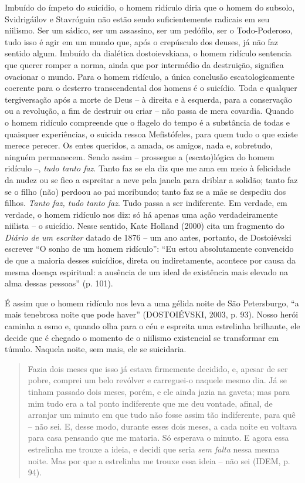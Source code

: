 Imbuído do ímpeto do suicídio, o homem ridículo diria que o homem do
subsolo, Svidrigáilov e Stavróguin não estão sendo suficientemente
radicais em seu niilismo. Ser um sádico, ser um assassino, ser um
pedófilo, ser o Todo-Poderoso, tudo isso é agir em um mundo que, após o
crepúsculo dos deuses, já não faz sentido algum. Imbuído da dialética
dostoievskiana, o homem ridículo sentencia que querer romper a norma,
ainda que por intermédio da destruição, significa ovacionar o mundo.
Para o homem ridículo, a única conclusão escatologicamente coerente para
o desterro transcendental dos homens é o suicídio. Toda e qualquer
tergiversação após a morte de Deus -- à direita e à esquerda, para a
conservação ou a revolução, a fim de destruir ou criar -- não passa de
mera covardia. Quando o homem ridículo compreende que o flagelo do tempo
é a substância de todas e quaisquer experiências, o suicida ressoa
Mefistófeles, para quem tudo o que existe merece perecer. Os entes
queridos, a amada, os amigos, nada e, sobretudo, ninguém permanecem.
Sendo assim -- prossegue a (escato)lógica do homem ridículo --,
\emph{tudo tanto faz}. Tanto faz se ela diz que me ama em meio à
felicidade da nudez ou se fico a espreitar a neve pela janela para
driblar a solidão; tanto faz se o filho (não) perdoou ao pai moribundo;
tanto faz se a mãe se despediu dos filhos. \emph{Tanto faz, tudo tanto
faz}. Tudo passa a ser indiferente. Em verdade, em verdade, o homem
ridículo nos diz: só há apenas uma ação verdadeiramente niilista -- o
suicídio. Nesse sentido, Kate Holland (2000) cita um fragmento do
\emph{Diário de um escritor} datado de 1876 -- um ano antes, portanto,
de Dostoiévski escrever ``O sonho de um homem ridículo'': ``Eu estou
absolutamente convencido de que a maioria desses suicídios, direta ou
indiretamente, acontece por causa da mesma doença espiritual: a ausência
de um ideal de existência mais elevado na alma dessas pessoas'' (p.
101).

É assim que o homem ridículo nos leva a uma gélida noite de São
Petersburgo, ``a mais tenebrosa noite que pode haver'' (DOSTOIÉVSKI,
2003, p. 93). Nosso herói caminha a esmo e, quando olha para o céu e
espreita uma estrelinha brilhante, ele decide que é chegado o momento de
o niilismo existencial se transformar em túmulo. Naquela noite, sem
mais, ele se suicidaria.

\begin{quote}
Fazia dois meses que isso já estava firmemente decidido, e, apesar de
ser pobre, comprei um belo revólver e carreguei-o naquele mesmo dia. Já
se tinham passado dois meses, porém, e ele ainda jazia na gaveta; mas
para mim tudo era a tal ponto indiferente que me deu vontade, afinal, de
arranjar um minuto em que tudo não fosse assim tão indiferente, para quê
-- não sei. E, desse modo, durante esses dois meses, a cada noite eu
voltava para casa pensando que me mataria. Só esperava o minuto. E agora
essa estrelinha me trouxe a ideia, e decidi que seria \emph{sem falta}
nessa mesma noite. Mas por que a estrelinha me trouxe essa ideia -- não
sei (IDEM, p. 94).
\end{quote}

